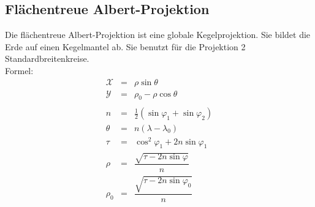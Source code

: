 \subsection{Flächentreue Albert-Projektion}
\label{sec:albert}
Die flächentreue Albert-Projektion ist eine globale Kegelprojektion. Sie bildet die Erde auf einen Kegelmantel ab. Sie benutzt für die Projektion 2 Standardbreitenkreise. 
\\

Formel:\\ 
\begin{eqnarray*}
\mathcal{X}&=&\rho \sin \theta \\
\mathcal{Y}&=&\rho _0 -\rho \cos \theta\\
\\
n&=&\frac{1}{2}(\sin \varphi _1 +\sin \varphi _2)\\
\theta &=&n(\lambda -\lambda _0)\\
\tau &=&\cos ^2 \varphi _1 +2n\sin \varphi _1\\
\rho &=&\dfrac{\sqrt{\tau -2n\sin \varphi}}{n}\\
\rho _0 &=&\dfrac{\sqrt{\tau -2n\sin \varphi _0}}{n}
\end{eqnarray*}